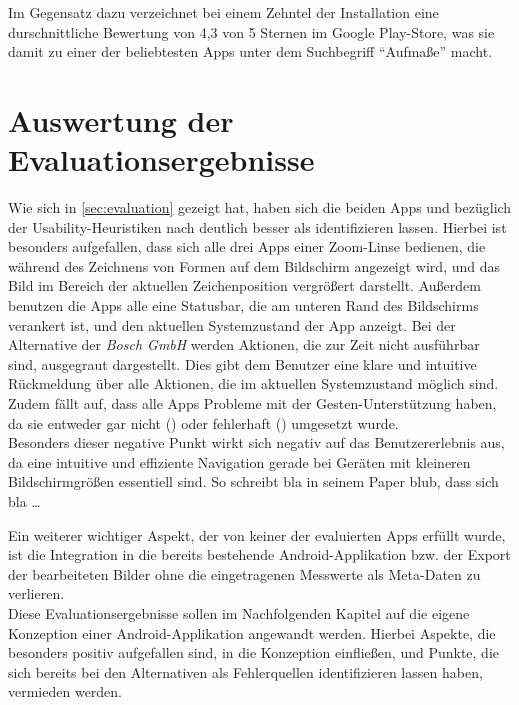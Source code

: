 
Im Gegensatz dazu verzeichnet \pm{} bei einem Zehntel der Installation eine durschnittliche Bewertung von 4,3 von 5 Sternen im Google Play-Store, was sie damit zu einer der beliebtesten Apps unter dem Suchbegriff ``Aufmaße'' macht.





\section{Auswertung der Evaluationsergebnisse}

Wie sich in \autoref{sec:evaluation} gezeigt hat, haben sich die beiden Apps \mm{} und \pm{} bezüglich der Usability-Heuristiken nach \citeauthor{Nielsen94} deutlich besser als \ms{} identifizieren lassen. 
Hierbei ist besonders aufgefallen, dass sich alle drei Apps einer Zoom-Linse bedienen, die während des Zeichnens von Formen auf dem Bildschirm angezeigt wird, und das Bild im Bereich der aktuellen Zeichenposition vergrößert darstellt.
Außerdem benutzen die Apps alle eine Statusbar, die am unteren Rand des Bildschirms verankert ist, und den aktuellen Systemzustand der App anzeigt.
Bei der Alternative der \emph{Bosch GmbH} werden Aktionen, die zur Zeit nicht ausführbar sind, ausgegraut dargestellt. Dies gibt dem Benutzer eine klare und intuitive Rückmeldung über alle Aktionen, die im aktuellen Systemzustand möglich sind.
Zudem fällt auf, dass alle Apps Probleme mit der Gesten-Unterstützung haben, da sie entweder gar nicht () oder fehlerhaft () umgesetzt wurde. \\
Besonders dieser negative Punkt wirkt sich negativ auf das Benutzererlebnis aus, da eine intuitive und effiziente Navigation gerade bei Geräten mit kleineren Bildschirmgrößen essentiell sind. 
So schreibt bla in seinem Paper blub, dass sich bla \dots

Ein weiterer wichtiger Aspekt, der von keiner der evaluierten Apps erfüllt wurde, ist die Integration in die bereits bestehende Android-Applikation bzw. der Export der bearbeiteten Bilder ohne die eingetragenen Messwerte als Meta-Daten zu verlieren. \\

Diese Evaluationsergebnisse sollen im Nachfolgenden Kapitel auf die eigene Konzeption einer Android-Applikation angewandt werden.
Hierbei Aspekte, die besonders positiv aufgefallen sind, in die Konzeption einfließen, und Punkte, die sich bereits bei den Alternativen als Fehlerquellen identifizieren lassen haben, vermieden werden.
